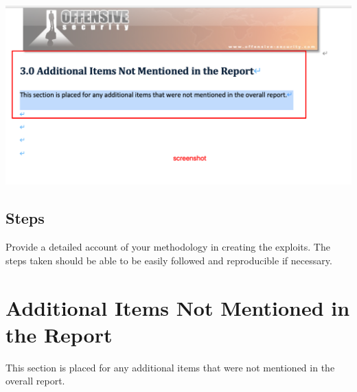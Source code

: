 \documentclass[a4paper]{article}
\begin{document}
\includegraphics[]{screenshot.png}

\subsection{Steps}
Provide a detailed account of your methodology in creating the exploits. The steps taken should be able to be easily followed and reproducible if necessary.

\section{Additional Items Not Mentioned in the Report}
This section is placed for any additional items that were not mentioned in the overall report.
\end{document}
